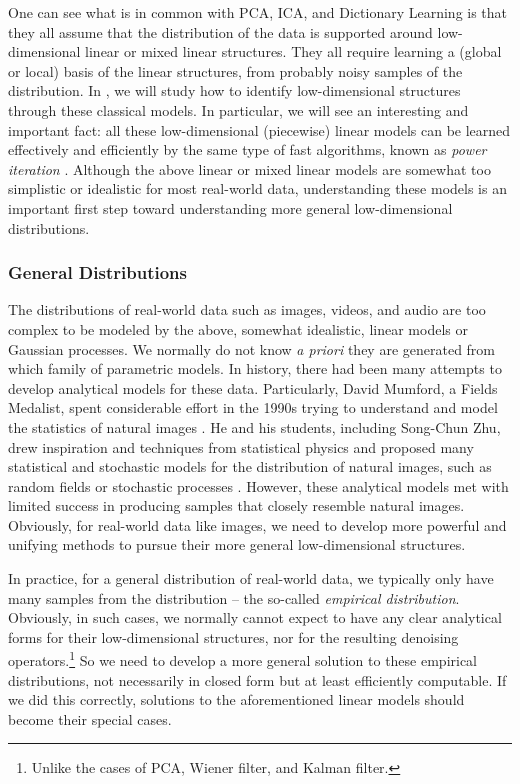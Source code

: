 \documentclass[../../book-main.tex]{subfiles}
\begin{document}
One can see what is in common with PCA, ICA, and Dictionary Learning is that they all assume that the distribution of the data is supported around low-dimensional linear or mixed linear structures. They all require learning a (global or local) basis of the linear structures, from probably noisy samples of the distribution. In , we will study how to identify low-dimensional structures through these classical models. In particular, we will see an interesting and important fact: all these low-dimensional (piecewise) linear models can be learned effectively and efficiently by the same type of fast algorithms, known as {\em power iteration} \cite{Zhai-2020}. Although the above linear or mixed linear models are somewhat too simplistic or idealistic for most real-world data, understanding these models is an important first step toward understanding more general low-dimensional distributions. 

\subsubsection{General Distributions}\label{sec:denoising-intro}

The distributions of real-world data such as images, videos, and audio are too complex to be modeled by the above, somewhat idealistic, linear models or Gaussian processes. We normally do not know {\em a priori} they are generated from which family of parametric models. In history, there had been many attempts to develop analytical models for these data. Particularly, David Mumford, a Fields Medalist, spent considerable effort in the 1990s trying to understand and model the statistics of natural images \cite{Mumford1996TheSD}. He and his students, including Song-Chun Zhu, drew inspiration and techniques from statistical physics and proposed many statistical and stochastic models for the distribution of natural images, such as random fields or stochastic processes \cite{Zhu-Entropy-1997,Zhu1997LearningGP,Zhu1997Prior,Huang-Mumford,Mumford-1999,Lee-Mumford}. However, these analytical models met with limited success in producing samples that closely resemble natural images. Obviously, for real-world data like images, we need to develop more powerful and unifying methods to pursue their more general low-dimensional structures.

In practice, for a general distribution of real-world data, we typically only have many samples from the distribution -- the so-called {\em empirical distribution}. Obviously, in such cases, we normally cannot expect to have any clear analytical forms for their low-dimensional structures, nor for the resulting denoising operators.\footnote{Unlike the cases of PCA, Wiener filter, and Kalman filter.} So we need to develop a more general solution to these empirical distributions, not necessarily in closed form but at least efficiently computable. If we did this correctly, solutions to the aforementioned linear models should become their special cases. 
\end{document}
